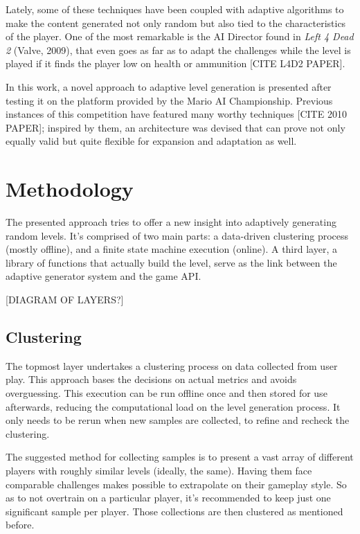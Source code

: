 \documentclass[conference]{IEEEtran}
\begin{document}
Lately, some of these techniques have been coupled with adaptive algorithms to make the content generated not only random but also tied to the characteristics of the player. One of the most remarkable is the AI Director found in \textit{Left 4 Dead 2} (Valve, 2009), that even goes as far as to adapt the challenges while the level is played if it finds the player low on health or ammunition [CITE L4D2 PAPER].

In this work, a novel approach to adaptive level generation is presented after testing it on the platform provided by the Mario AI Championship. Previous instances of this competition have featured many worthy techniques [CITE 2010 PAPER]; inspired by them, an architecture was devised that can prove not only equally valid but quite flexible for expansion and adaptation as well.

\section{Methodology}

The presented approach tries to offer a new insight into adaptively generating random levels. It's comprised of two main parts: a data-driven clustering process (mostly offline), and a finite state machine execution (online). A third layer, a library of functions that actually build the level, serve as the link between the adaptive generator system and the game API.

[DIAGRAM OF LAYERS?]

\subsection*{Clustering}

The topmost layer undertakes a clustering process on data collected from user play. This approach bases the decisions on actual metrics and avoids overguessing. This execution can be run offline once and then stored for use afterwards, reducing the computational load on the level generation process. It only needs to be rerun when new samples are collected, to refine and recheck the clustering.

The suggested method for collecting samples is to present a vast array of different players with roughly similar levels (ideally, the same). Having them face comparable challenges makes possible to extrapolate on their gameplay style. So as to not overtrain on a particular player, it's recommended to keep just one significant sample per player. Those collections are then clustered as mentioned before.
\end{document}
